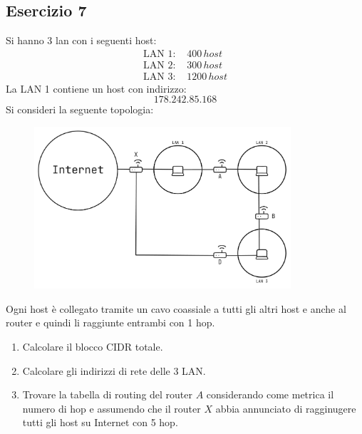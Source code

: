 \documentclass[a4paper]{article}
\begin{document}
\subsection{Esercizio 7}
Si hanno 3 lan con i seguenti host:
\[
\begin{aligned}
  \text{LAN 1: } & 400 \, host\\
  \text{LAN 2: } & 300 \, host\\
  \text{LAN 3: } & 1200 \, host
\end{aligned}
\] 
La LAN 1 contiene un host con indirizzo:
\[
178.242.85.168
\] 
Si consideri la seguente topologia:
\begin{figure}[H]
  \centering
  \includegraphics[width=0.85\textwidth]{../figures/esercitazione-es7-tcp}
\end{figure}
\noindent
Ogni host è collegato tramite un cavo coassiale a tutti gli altri host e anche al router
e quindi li raggiunte entrambi con 1 hop.
\begin{enumerate}
  \item Calcolare il blocco CIDR totale.
  \item Calcolare gli indirizzi di rete delle 3 LAN.
  \item Trovare la tabella di routing del router \( A \) considerando come metrica
    il numero di hop e assumendo che il router \( X \) abbia annunciato di ragginugere
    tutti gli host su Internet con 5 hop.
\end{enumerate}
\end{document}
